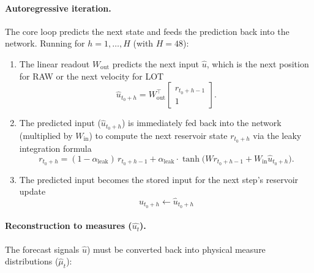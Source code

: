 \documentclass[11pt]{article}
\newcommand{\chg}[1]{{\color{red}#1}}
\newcommand{\1}{\mathbf{1}}
\begin{document}
\paragraph{Autoregressive iteration.} The core loop predicts the next state and feeds the prediction back into the network. Running for $h = 1,\dots,H$ (with $H = 48$):
\begin{enumerate}
\item The linear readout $W_{\text{out}}$ predicts the next input \chg{$\widehat{u}$}, which is the next position for RAW or the next velocity for LOT
\[
\widehat{u}_{t_0+h} = W_{\text{out}}^\top \begin{bmatrix} r_{t_0+h-1} \\ 1 \end{bmatrix}.
\]

\item The predicted input ($\widehat{u}_{t_0+h}$) is immediately fed back into the network (multiplied by $W_{\text{in}}$) to compute the next reservoir state $r_{t_0+h}$ via the leaky integration formula
\[
r_{t_0+h} = (1 - \alpha_{\text{leak}})\, r_{t_0+h-1} 
+ \alpha_{\text{leak}} \cdot \tanh\big(W r_{t_0+h-1} + W_{\text{in}} \widehat{u}_{t_0+h}\big).
\]

\item The predicted input becomes the stored input for the next step's reservoir update
\[
u_{t_0+h} \gets \widehat{u}_{t_0+h}
\]

\end{enumerate}

\paragraph{Reconstruction to measures ($\widehat{u_t}$).} The forecast signals $\widehat{u}$) must be converted back into physical measure distributions ($\widehat{\mu}_t$):
\end{document}
